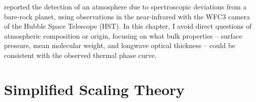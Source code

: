 \citet{tsiaras2016detection} reported the detection of an atmosphere due to spectroscopic deviations from a bare-rock planet, using observations in the near-infrared with the WFC3 camera of the Hubble Space Telescope (HST). In this chapter, I avoid direct questions of atmospheric composition or origin, focusing on what bulk properties -- surface pressure, mean molecular weight, and longwave optical thickness -- could be consistent with the observed thermal phase curve.
%
%
%






\section{Simplified Scaling Theory}\label{sec:scaling-relations}

